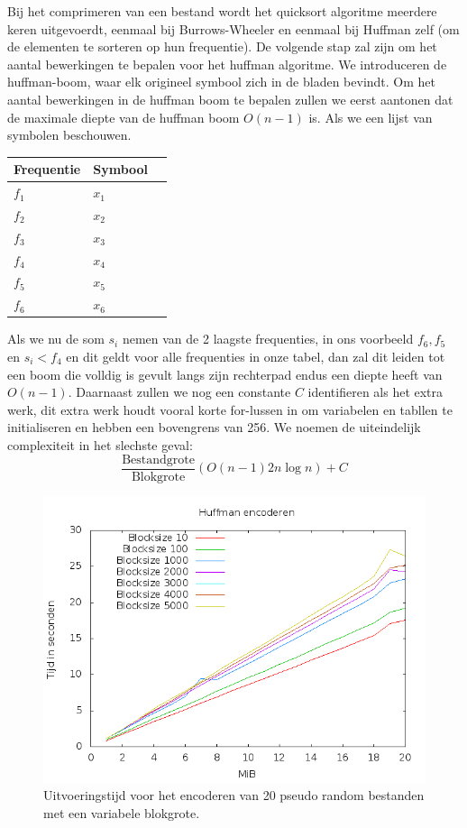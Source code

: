 \documentclass[10pt,a4paper]{report}
\begin{document}
Bij het comprimeren van een bestand wordt het quicksort algoritme meerdere keren uitgevoerdt, eenmaal bij Burrows-Wheeler en eenmaal bij Huffman zelf (om de elementen te sorteren op hun frequentie). De volgende stap zal zijn om het aantal bewerkingen te bepalen voor het huffman algoritme. We introduceren de huffman-boom, waar elk origineel symbool zich in de bladen bevindt. Om het aantal bewerkingen in de huffman boom te bepalen zullen we eerst aantonen dat de maximale diepte van de huffman boom $O(n-1)$ is. Als we een lijst van symbolen beschouwen.\\
\begin{center}
\begin{tabular}{llr}
\hline
Frequentie & Symbool \\
\hline
$f_{1}$ & $x_{1}$ \\
$f_{2}$ & $x_{2}$ \\
$f_{3}$ & $x_{3}$ \\
$f_{4}$ & $x_{4}$ \\
$f_{5}$ & $x_{5}$ \\
$f_{6}$ & $x_{6}$ \\
\hline
\hline
\end{tabular}
\end{center}
Als we nu de som $s_{i}$ nemen van de 2 laagste frequenties, in ons voorbeeld $f_{6},f_{5}$ en $s_{i} < f_{4}$ en dit geldt voor alle frequenties in onze tabel, dan zal dit leiden tot een boom die volldig is gevult langs zijn rechterpad endus een diepte heeft van $O(n-1)$. Daarnaast zullen we nog een constante $C$ identifieren als het extra werk, dit extra werk houdt vooral korte for-lussen in om variabelen en tabllen te initialiseren en hebben een bovengrens van 256. We noemen de uiteindelijk complexiteit in het slechste geval: 
$$
\frac{\text{Bestandgrote}}{\text{Blokgrote}} (O(n-1) 2 n\log n) + C
$$
\begin{figure}[hbt]
\includegraphics[scale=0.5]{huffman_encoderen.png}
\caption{Uitvoeringstijd voor het encoderen van 20 pseudo random bestanden met een variabele blokgrote.}
\end{figure}
\end{document}
